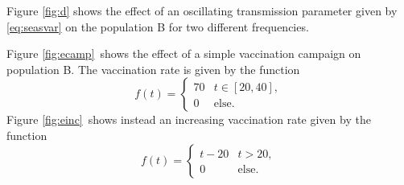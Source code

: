 \documentclass[a4paper,10pt,twocolumn]{article}
\begin{document}
Figure \ref{fig:d} shows the effect of an oscillating transmission parameter given by \ref{eq:seasvar} on the population B for two different frequencies.

Figure \ref{fig:ecamp} shows the effect of a simple vaccination campaign on population B. The vaccination rate is given by the function
\begin{equation}\label{eq:fcamp}
f(t) = \begin{cases} 70 &t\in[20,40],\\0&\mathrm{else}. \end{cases}
\end{equation} 
Figure \ref{fig:einc} shows instead an increasing vaccination rate given by the function
\begin{equation}\label{finc}
f(t) = \begin{cases} t-20 &t>20,\\0&\mathrm{else}. \end{cases}
\end{equation}
\end{document}
